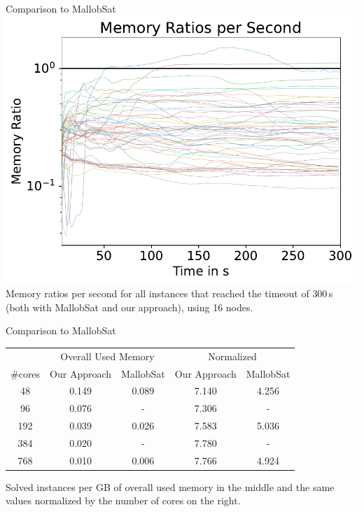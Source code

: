 \documentclass{beamer}
\begin{document}
\begin{frame}{Comparison to MallobSat}
    \center
    \includegraphics[scale=.45]{plots/16node_compare/mem_ratio_per_second.pdf}\\
    Memory ratios per second for all instances that reached the timeout of $300\,$s (both with MallobSat and our approach), using 16 nodes. %
\end{frame}

\begin{frame}{Comparison to MallobSat}
    \begin{table}[scale=.75]
        \center
        \begin{tabular}{ ccccc }
          \toprule
          \multicolumn{1}{c}{} & \multicolumn{2}{c}{Overall Used Memory} & \multicolumn{2}{c}{Normalized}\\
          \#cores & Our Approach & MallobSat & Our Approach & MallobSat \\
          \midrule
          48  & 0.149 & 0.089 & 7.140 & 4.256\\
          96  & 0.076 & -     & 7.306 & -\\
          192 & 0.039 & 0.026 & 7.583 & 5.036\\
          384 & 0.020 & -     & 7.780 & -\\
          768 & 0.010 & 0.006 & 7.766 & 4.924\\
          \bottomrule
        \end{tabular}
    \end{table}
    \vfill
    Solved instances per GB of overall used memory in the middle and the same values normalized by the number of cores on the right.
\end{frame}
\end{document}
